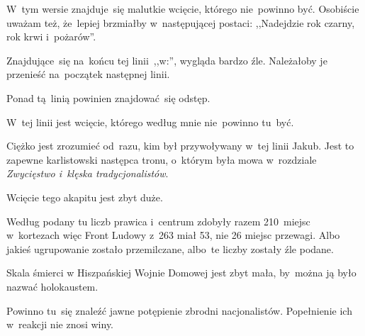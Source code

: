 \documentclass[a4paper,11pt]{article}
\begin{document}
\vspace{\spaceFour}


\start {} W~tym wersie znajduje~się malutkie wcięcie,
którego nie~powinno być. Osobiście uważam też, że~lepiej brzmiałby
w~następującej postaci: ,,Nadejdzie rok czarny, rok krwi i~pożarów''.

\vspace{\spaceFour}


\start {} Znajdujące~się na~końcu tej linii~,,w:'',
wygląda bardzo źle. Należałoby je przenieść na~początek następnej
linii.

\vspace{\spaceFour}


\start {} Ponad tą~linią powinien znajdować~się odstęp.

\vspace{\spaceFour}


\start {} W~tej linii jest wcięcie, którego według mnie
nie~powinno tu~być.

\vspace{\spaceFour}


\start {} Ciężko jest zrozumieć od~razu, kim był
przywoływany w~tej linii Jakub. Jest to zapewne karlistowski następca
tronu, o~którym była mowa w~rozdziale \emph{Zwycięstwo i~klęska
  tradycjonalistów}. 

\vspace{\spaceFour}


\start {} Wcięcie tego akapitu jest zbyt duże.

\vspace{\spaceFour}


\start {} Według podany tu liczb prawica i~centrum zdobyły
razem 210~miejsc w~kortezach więc Front Ludowy z~263 miał 53, nie 26
miejsc przewagi. Albo jakieś ugrupowanie zostało przemilczane, albo~te
liczby zostały źle podane.

\vspace{\spaceFour}


\start {} Skala śmierci w Hiszpańskiej Wojnie Domowej jest
zbyt mała, by~można ją było nazwać holokaustem.

\vspace{\spaceFour}


\start {} Powinno tu~się znaleźć jawne potępienie zbrodni
nacjonalistów. Popełnienie ich w~reakcji nie znosi winy.

\vspace{\spaceFour}
\end{document}
